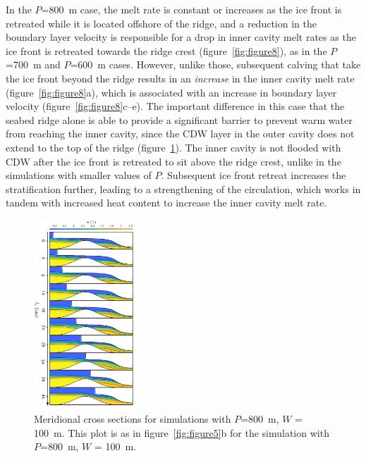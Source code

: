 \documentclass[draft]{agujournal2019}
\begin{document}
In the $P$=800~m case, the melt rate is constant or increases as the ice front is retreated  while it is located offshore of the ridge, and a reduction in the boundary layer velocity is responsible for a drop in inner cavity melt rates as the ice front is retreated towards the ridge crest (figure~\ref{fig:figure8}), as in the $P$=700~m and $P$=600~m cases. However, unlike those, subsequent calving that take the ice front beyond the ridge results in an \emph{increase} in the inner cavity melt rate (figure~\ref{fig:figure8}a), which is associated with an increase in boundary layer velocity (figure~\ref{fig:figure8}c--e). The important difference in this case that the seabed ridge alone is able to provide a significant barrier to prevent warm water from reaching the inner cavity, since the CDW layer in the outer cavity does not extend to the top of the ridge (figure~\ref{fig:figure9}). The inner cavity is not flooded with CDW after the ice front is retreated to sit above the ridge crest, unlike in the simulations with smaller values of $P$. Subsequent ice front retreat increases the stratification further, leading to a strengthening of the circulation, which works in tandem with increased heat content to increase the inner cavity melt rate.


\begin{figure}
    \centering
    \includegraphics[width = 0.35\textwidth]{../make_figures/plots/figure9_axislabel.pdf}
    \caption{Meridional cross sections for simulations with $P$=800~m, $W$ = 100~m. This plot is as in figure~\ref{fig:figure5}b for the simulation with $P$=800~m, $W$ = 100~m. }
    \label{fig:figure9}
\end{figure}
\end{document}
